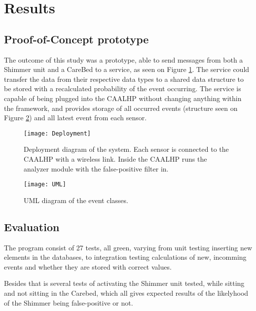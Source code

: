 \section{Results}

\subsection{Proof-of-Concept prototype}

The outcome of this study was a prototype, able to send messages from both a Shimmer unit and a CareBed to a service, as seen on Figure \ref{fig:deployment}.
The service could transfer the data from their respective data types to a shared data structure to be stored with a recalculated probability of the event occurring.
The service is capable of being plugged into the CAALHP without changing anything within the framework, and provides storage of all occurred events (structure seen on Figure \ref{fig:UML}) and all latest event from each sensor.

\begin{figure}[hbtp]
	\centering
	\texttt{[image: Deployment]}
	\caption{Deployment diagram of the system. 
		Each sensor is connected to the CAALHP with a wireless link.
		Inside the CAALHP runs the analyzer module with the false-positive filter in.}
	\label{fig:deployment}
\end{figure}

\begin{figure}[hbtp]
	\centering
	\texttt{[image: UML]}
	\caption{UML diagram of the event classes.}
	\label{fig:UML}
\end{figure}




\subsection{Evaluation}

The program consist of 27 tests, all green, varying from unit testing inserting new elements in the databases, to integration testing calculations of new, incomming events and whether they are stored with correct values.

Besides that is several tests of activating the Shimmer unit tested, while sitting and not sitting in the Carebed, which all gives expected results of the likelyhood of the Shimmer being false-positive or not.




